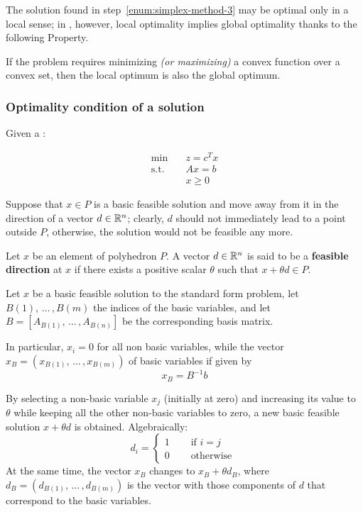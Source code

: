 \documentclass[english]{article}
\begin{document}
\bigskip
The solution found in step~\ref{enum:simplex-method-3} may be optimal only in a local sense;
in \LP, however, local optimality implies global optimality thanks to the following Property.

\begin{property}
  If the \LP problem requires minimizing \textit{(or maximizing)} a convex function over a convex set, then the local optimum is also the global optimum.
  \label{prop:optimal-vertex}
\end{property}

\subsubsection{Optimality condition of a \LP solution}

Given a \LP:

\begin{align*}
  \min \quad        & z = c^T x \\
  \text{s.t.} \quad & Ax = b    \\
                    & x \geq 0
\end{align*}

Suppose that \(x \in P\) is a basic feasible solution and move away from it in the direction of a vector \(d \in \mathbb{R}^n\);
clearly, \(d\) should not immediately lead to a point outside \(P\), otherwise, the solution would not be feasible any more.

\begin{definition}
  \label{def:feasible-direction}
  Let \(x\) be an element of polyhedron \(P\).
  A vector \(d \in \mathbb{R}^n\) is said to be a \textbf{feasible direction} at \(x\) if there exists a positive scalar \(\theta\) such that \(x + \theta d \in P\).
\end{definition}

\bigskip
Let \(x\) be a basic feasible solution to the standard form problem, let \(B(1), \, \ldots \,, B(m)\) the indices of the basic variables, and let \(B = \left[ A_{B(1)}, \, \ldots \,, A_{B(n)} \right]\) be the corresponding basis matrix.

In particular, \(x_i = 0\) for all non basic variables, while the vector \(x_B = \left( x_{B(1)}, \, \ldots \,, x_{B(m)} \right)\) of basic variables if given by
\[x_B = B^{-1}b\]

By selecting a non-basic variable \(x_j\) (initially at zero) and increasing its value to \(\theta\) while keeping all the other non-basic variables to zero, a new basic feasible solution \(x + \theta d\) is obtained.
Algebraically:
\[ d_i = \begin{cases}
    1 \quad & \text{ if } i = j  \\
    0 \quad & \text{ otherwise }
  \end{cases} \]
At the same time, the vector \(x_B\) changes to \(x_B + \theta d_B\), where \(d_B = (d_{B(1)}, \, \ldots \,, d_{B(m)})\) is the vector with those components of \(d\) that correspond to the basic variables.
\end{document}
